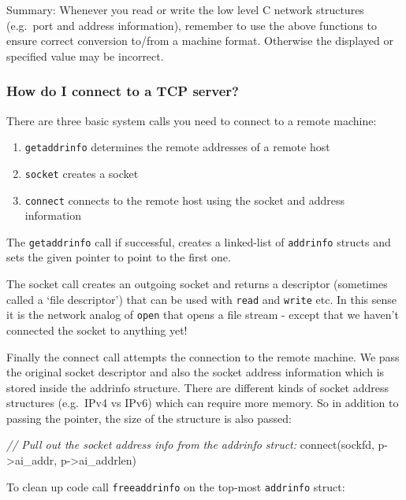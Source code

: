 \documentclass[]{article}
\newenvironment{Shaded}{}{}
\newcommand{\CommentTok}[1]{\textcolor[rgb]{0.38,0.63,0.69}{\textit{{#1}}}}
\newcommand{\NormalTok}[1]{{#1}}
\begin{document}
Summary: Whenever you read or write the low level C network structures
(e.g.~port and address information), remember to use the above functions
to ensure correct conversion to/from a machine format. Otherwise the
displayed or specified value may be incorrect.

\subsubsection{How do I connect to a TCP
server?}\label{how-do-i-connect-to-a-tcp-server}

There are three basic system calls you need to connect to a remote
machine:

\begin{enumerate}
\item
  \texttt{getaddrinfo} determines the remote addresses of a remote host
\item
  \texttt{socket} creates a socket
\item
  \texttt{connect} connects to the remote host using the socket and
  address information
\end{enumerate}

The \texttt{getaddrinfo} call if successful, creates a linked-list of
\texttt{addrinfo} structs and sets the given pointer to point to the
first one.

The socket call creates an outgoing socket and returns a descriptor
(sometimes called a `file descriptor') that can be used with
\texttt{read} and \texttt{write} etc. In this sense it is the network
analog of \texttt{open} that opens a file stream - except that we
haven't connected the socket to anything yet!

Finally the connect call attempts the connection to the remote machine.
We pass the original socket descriptor and also the socket address
information which is stored inside the addrinfo structure. There are
different kinds of socket address structures (e.g.~IPv4 vs IPv6) which
can require more memory. So in addition to passing the pointer, the size
of the structure is also passed:

\begin{Shaded}
\begin{Highlighting}[]
\CommentTok{// Pull out the socket address info from the addrinfo struct:}
\NormalTok{connect(sockfd, p->ai_addr, p->ai_addrlen)}
\end{Highlighting}
\end{Shaded}

To clean up code call \texttt{freeaddrinfo} on the top-most
\texttt{addrinfo} struct:
\end{document}
